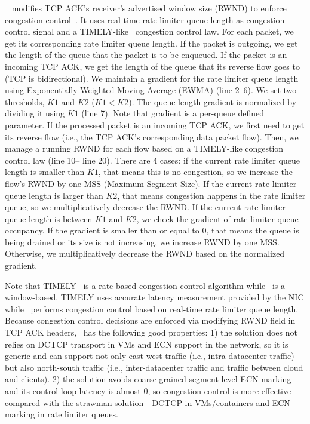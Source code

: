 ~\spring{} modifies TCP ACK's receiver's 
advertised window size (RWND) to enforce congestion control~\cite{he2016ac,cronkite2016virtualized}.
It uses real-time rate limiter queue length as congestion control signal and 
a TIMELY-like~\cite{mittal2015timely} congestion control law.
For each packet, 
we get its corresponding rate limiter queue length.
If the packet is outgoing, we get the length of the queue that the packet is to be enqueued.
If the packet is an incoming TCP ACK, we get the length of the queue that 
its reverse flow goes to (TCP is bidirectional).  
We maintain a gradient for the rate limiter queue length using 
Exponentially Weighted Moving Average (EWMA) (line 2--6). 
We set two thresholds, $K1$ and $K2$ ($K1 < K2$). The queue length gradient is normalized by dividing it using $K1$ (line 7).
Note that gradient is a per-queue defined parameter.
If the processed packet is an incoming TCP ACK, we first need to get its reverse 
flow (i.e., the TCP ACK's corresponding data packet flow). Then, 
we manage a running RWND for each flow based on a TIMELY-like congestion control law 
(line 10-- line 20). There are 4 cases: 
if the current rate limiter queue length is smaller than $K1$, that means this is no congestion, so we 
increase the flow's RWND by one MSS (Maximum Segment Size). If the current rate limiter queue length is larger
than $K2$, that means congestion happens in the rate limiter queue, so we multiplicatively decrease the RWND. 
If the current rate limiter queue length is between $K1$ and $K2$, we check the gradient of rate limiter queue occupancy.
If the gradient is smaller than or equal to 0, that means the queue is being drained or its size is not increasing, we 
increase RWND by one MSS. Otherwise, we multiplicatively decrease the RWND based on the normalized gradient.

Note that TIMELY~\cite{mittal2015timely} is a rate-based congestion control algorithm while~\spring{} is a window-based.
TIMELY uses accurate latency measurement provided by the NIC while~\spring{} performs congestion control based on 
real-time rate limiter queue length. Because congestion control decisions are enforced via modifying RWND field in TCP ACK headers,~\spring{} has the following good properties: 
1) the solution does not relies on DCTCP transport in VMs and ECN support in the network, 
so it is generic and can support not only east-west traffic (i.e., intra-datacenter traffic) but also north-south traffic
(i.e., inter-datacenter traffic and traffic between cloud and clients). 
2) the solution avoids coarse-grained segment-level ECN marking and its control loop latency is almost 0, so congestion control
is more effective compared with the strawman solution---DCTCP in VMs/containers and ECN marking in rate limiter queues.  

